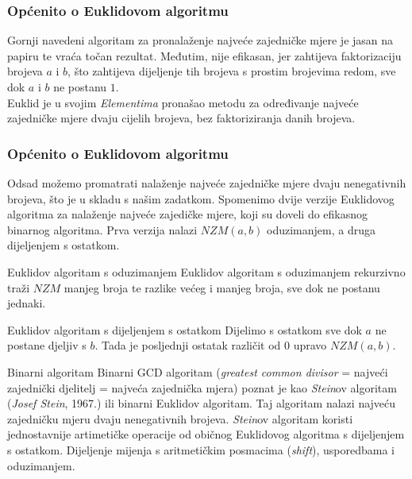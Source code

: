 \documentclass[xcolor=dvipsnames, notheorems]{beamer}
\theoremstyle{plain} %
\theoremstyle{definition} %
\begin{document}
\begin{frame}
\frametitle{Općenito o Euklidovom algoritmu}
Gornji navedeni algoritam za pronalaženje najveće zajedničke mjere je jasan na papiru te vraća točan rezultat. Međutim, nije efikasan, jer zahtijeva faktorizaciju brojeva $a$ i $b$, što zahtijeva dijeljenje tih brojeva s prostim brojevima redom, sve dok $a$ i $b$ ne postanu $1$.\\
Euklid je u svojim \emph{Elementima} pronašao metodu za određivanje najveće zajedničke mjere dvaju cijelih brojeva, bez faktoriziranja danih brojeva.
\end{frame}

\begin{frame}
\frametitle{Općenito o Euklidovom algoritmu}
Odsad možemo promatrati nalaženje najveće zajedničke mjere dvaju nenegativnih brojeva, što je u skladu s našim zadatkom. Spomenimo dvije verzije Euklidovog algoritma za nalaženje najveće zajedičke mjere, koji su doveli do efikasnog binarnog algoritma. Prva verzija nalazi $NZM(a,b)$ oduzimanjem, a druga dijeljenjem s ostatkom.
\end{frame}
\begin{frame}{Euklidov algoritam s oduzimanjem}
Euklidov algoritam s oduzimanjem rekurzivno traži $NZM$ manjeg broja te razlike većeg i manjeg broja, sve dok ne postanu jednaki.
 
\end{frame}
\begin{frame}{Euklidov algoritam s dijeljenjem s ostatkom}
Dijelimo s ostatkom sve dok $a$ ne postane djeljiv s $b$. Tada je posljednji ostatak različit od $0$ upravo $NZM(a,b)$.
 
\end{frame}
\begin{frame}{Binarni algoritam}
Binarni GCD algoritam (\emph{greatest common divisor} = najveći zajednički djelitelj = najveća zajednička mjera) poznat je kao \emph{Stein}ov algoritam (\emph{Josef Stein}, 1967.) ili binarni Euklidov algoritam. Taj algoritam nalazi najveću zajedničku mjeru dvaju nenegativnih brojeva. \emph{Stein}ov algoritam koristi jednostavnije artimetičke operacije od običnog Euklidovog algoritma s dijeljenjem s ostatkom. Dijeljenje mijenja s aritmetičkim posmacima (\emph{shift}), usporedbama i oduzimanjem. 
\end{frame}
\end{document}
